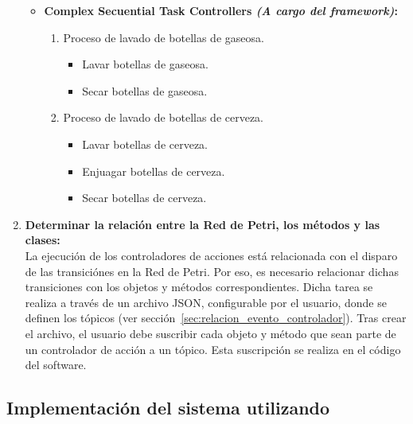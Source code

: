 \begin{enumerate}
\begin{itemize}
\begin{enumerate}[resume , label=\fbox{\arabic*}]
                  \end{enumerate}
              \item \textbf{Complex Secuential Task Controllers \emph{(A cargo
              del framework)}:} \begin{enumerate}[resume, label=\fbox{\arabic*}]
                    \item Proceso de lavado de botellas de gaseosa.
                        \begin{itemize}
                          \item Lavar botellas de gaseosa.
                          \item Secar botellas de gaseosa.
                      \end{itemize}
                    \item Proceso de lavado de botellas de cerveza.
                        \begin{itemize}
                          \item Lavar botellas de cerveza.
                          \item Enjuagar botellas de cerveza.
                          \item Secar botellas de cerveza.
                      \end{itemize}
                  \end{enumerate}
            \end{itemize}

\item \textbf{Determinar la relación entre la Red de Petri, los métodos y las clases:}\\
            La ejecución de los controladores de acciones está relacionada con el
            disparo de las transiciónes en la Red de Petri. Por eso, es necesario 
            relacionar dichas transiciones con los objetos y métodos correspondientes.
            Dicha tarea se realiza a través de un archivo JSON, configurable por el
            usuario, donde se definen los tópicos (ver
            sección~\ref{sec:relacion_evento_controlador}). Tras crear el archivo, el
            usuario debe suscribir cada objeto y método que sean parte de un controlador
            de acción a un tópico. Esta suscripción se realiza en el código del software.
\end{enumerate}

\subsection {Implementación del sistema utilizando \nombreFramework}

